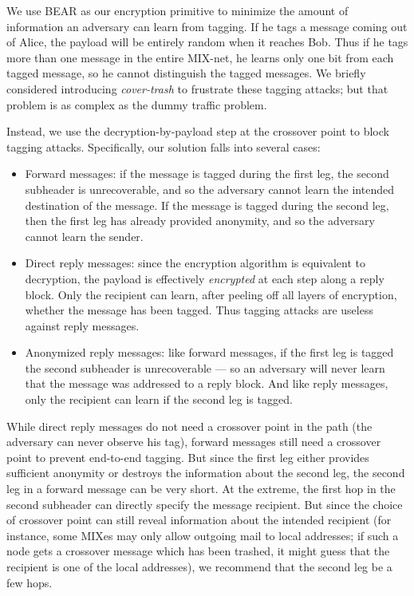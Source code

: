 \documentclass{llncs}
\begin{document}
We use BEAR as our encryption primitive to minimize the amount of
information an adversary can learn from tagging. If he tags a message
coming out of Alice, the payload will be entirely random when it reaches
Bob. Thus if he tags more than one message in the entire MIX-net, he
learns only one bit from each tagged message, so he cannot distinguish
the tagged messages. We briefly considered introducing \emph{cover-trash}
to frustrate these tagging attacks; but that problem is as complex as
the dummy traffic problem.

Instead, we use the decryption-by-payload step at the crossover point to
block tagging attacks. Specifically, our solution falls into several cases:

\begin{itemize}
\item Forward messages: if the message is tagged during the first leg,
the second subheader is unrecoverable, and so the adversary cannot
learn the intended destination of the message. If the message is tagged
during the second leg, then the first leg has already provided anonymity,
and so the adversary cannot learn the sender.
\item Direct reply messages: since the encryption algorithm is equivalent to
decryption, the payload is effectively \emph{encrypted} at each step
along a reply block. Only the recipient can learn, after peeling off
all layers of encryption, whether the message has been tagged. Thus
tagging attacks are useless against reply messages.
\item Anonymized reply messages: like forward messages, if the first leg
is tagged the second subheader is unrecoverable --- so an adversary will
never learn that the message was addressed to a reply block. And like
reply messages, only the recipient can learn if the second leg is tagged.
\end{itemize}

While direct reply messages do not need a crossover point in the path
(the adversary can never observe his tag), forward messages still need a
crossover point to prevent end-to-end tagging. But since the first leg
either provides sufficient anonymity or destroys the information about
the second leg, the second leg in a forward message can be very short.
At the extreme, the first hop in the second subheader can directly
specify the message recipient. But since the choice of crossover point
can still reveal information about the intended recipient (for instance,
some MIXes may only allow outgoing mail to local addresses; if such a
node gets a crossover message which has been trashed, it might guess
that the recipient is one of the local addresses), we recommend that
the second leg be a few hops.
\end{document}
